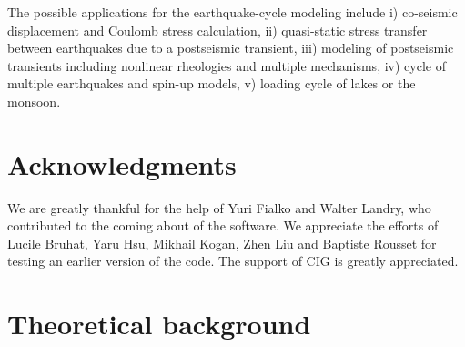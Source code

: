 \documentclass[10pt]{article}
\begin{document}
The possible applications for the earthquake-cycle modeling include i) co-seismic displacement and Coulomb stress calculation, ii) quasi-static stress transfer between earthquakes due to a postseismic transient, iii) modeling of postseismic transients including nonlinear rheologies and multiple mechanisms, iv) cycle of multiple earthquakes and spin-up models, v) loading cycle of lakes or the monsoon.

\section{Acknowledgments}
We are greatly thankful for the help of Yuri Fialko and Walter Landry, who contributed to the coming about of the software. We appreciate the efforts of Lucile Bruhat, Yaru Hsu, Mikhail Kogan, Zhen Liu and Baptiste Rousset for testing an earlier version of the code. The support of CIG is greatly appreciated.


\vspace{2.5cm}
\let\thefootnote\relax{}


\pagebreak

\tableofcontents

\pagebreak

\section{Theoretical background}
\end{document}
